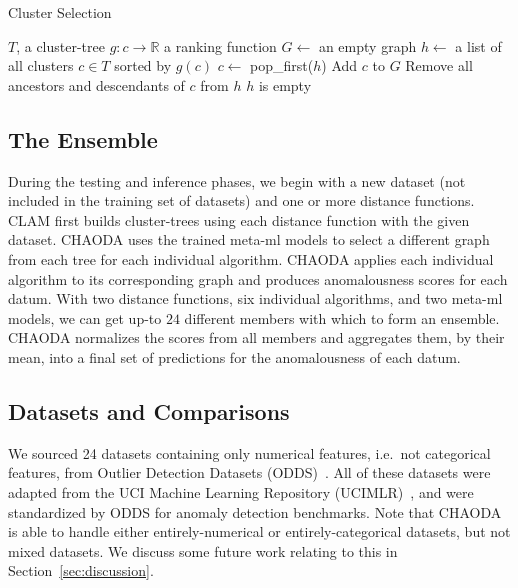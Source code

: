 \begin{algorithm}[h]
    \caption{Cluster Selection}
    \label{alg:cluster-selection}
\begin{algorithmic}[1]
    \REQUIRE $T$, a cluster-tree
    \REQUIRE $g : c \rightarrow \mathbb{R}$ a ranking function
    \STATE $G \gets$ an empty graph
    \STATE $h \gets$ a list of all clusters $c \in T$ sorted by $g(c)$
    \REPEAT
        \STATE $c \gets$ pop\_first($h$)
        \STATE Add $c$ to $G$
        \STATE Remove all ancestors and descendants of $c$ from $h$
    \UNTIL $h$ is empty
\end{algorithmic}
\end{algorithm}


\subsection{The Ensemble}
\label{subsec:methods:the-ensemble}

During the testing and inference phases, we begin with a new dataset (not included in the training set of datasets) and one or more distance functions.
CLAM first builds cluster-trees using each distance function with the given dataset.
CHAODA uses the trained meta-ml models to select a different graph from each tree for each individual algorithm.
CHAODA applies each individual algorithm to its corresponding graph and produces anomalousness scores for each datum.
With two distance functions, six individual algorithms, and two meta-ml models, we can get up-to $24$ different members with which to form an ensemble.
CHAODA normalizes the scores from all members and aggregates them, by their mean, into a final set of predictions for the anomalousness of each datum.


\subsection{Datasets and Comparisons}
\label{subsec:methods:datasets-and-comparisons}

We sourced 24 datasets containing only numerical features, i.e.\ not categorical features, from Outlier Detection Datasets (ODDS)~\cite{rayana2016odds}.
All of these datasets were adapted from the UCI Machine Learning Repository (UCIMLR)~\cite{UCIMLR}, and were standardized by ODDS for anomaly detection benchmarks.
Note that CHAODA is able to handle either entirely-numerical or entirely-categorical datasets, but not mixed datasets.
We discuss some future work relating to this in Section~\ref{sec:discussion}.

